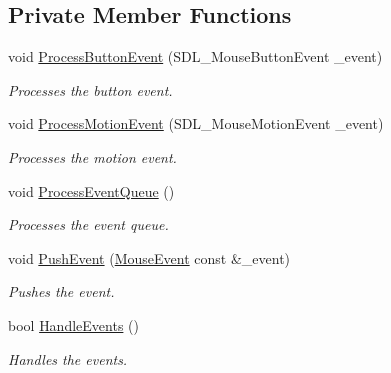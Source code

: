 \subsection*{Private Member Functions}
\begin{DoxyCompactItemize}
\item 
void \hyperlink{class_g_l_input_handler_aea8183a10d96367e27aea703b7c4ee04}{Process\+Button\+Event} (S\+D\+L\+\_\+\+Mouse\+Button\+Event \+\_\+event)
\begin{DoxyCompactList}\small\item\em Processes the button event. \end{DoxyCompactList}\item 
void \hyperlink{class_g_l_input_handler_ad7eac3e702846fe306fe4e712f4047f2}{Process\+Motion\+Event} (S\+D\+L\+\_\+\+Mouse\+Motion\+Event \+\_\+event)
\begin{DoxyCompactList}\small\item\em Processes the motion event. \end{DoxyCompactList}\item 
void \hyperlink{class_g_l_input_handler_a9f03ccbccd3bd3649874f8dfdeeb2271}{Process\+Event\+Queue} ()
\begin{DoxyCompactList}\small\item\em Processes the event queue. \end{DoxyCompactList}\item 
void \hyperlink{class_g_l_input_handler_ac7afbe98f44e66f580664716f19a6722}{Push\+Event} (\hyperlink{struct_mouse_event}{Mouse\+Event} const \&\+\_\+event)
\begin{DoxyCompactList}\small\item\em Pushes the event. \end{DoxyCompactList}\item 
bool \hyperlink{class_g_l_input_handler_a8024ecc15bf5f8a4fa048011eb9e77b1}{Handle\+Events} ()
\begin{DoxyCompactList}\small\item\em Handles the events. \end{DoxyCompactList}\end{DoxyCompactItemize}
